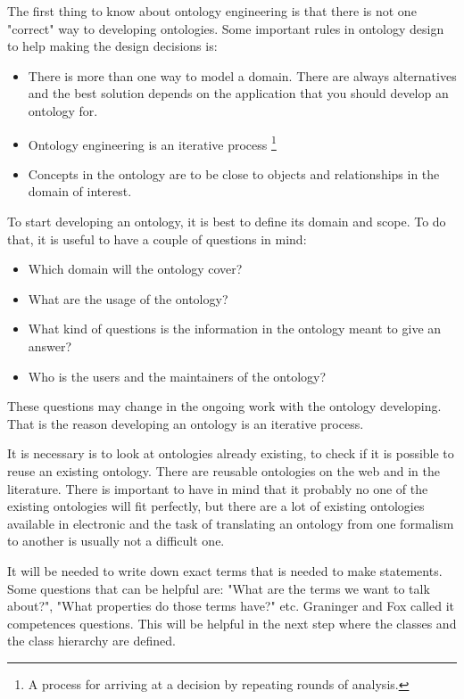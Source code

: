 The first thing to know about ontology engineering is that there is not one "correct" way to developing ontologies. Some important rules in ontology design to help making the design decisions is:
\begin{itemize}
	\item There is more than one way to model a domain. There are always alternatives and the best solution depends on the application that you should develop an ontology for.
	\item Ontology engineering is an iterative process \footnote{A process for arriving at a decision by repeating rounds of analysis.}
	\item Concepts in the ontology are to be close to objects and relationships in the domain of interest.
\end{itemize}

To start developing an ontology, it is best to define its domain and scope. To do that, it is useful to have a couple of questions in mind:
\begin{itemize}
	\item Which domain will the ontology cover?
	\item What are the usage of the ontology?
	\item What kind of questions is the information in the ontology meant to give an answer?
	\item Who is the users and the maintainers of the ontology?
\end{itemize}
These questions may change in the ongoing work with the ontology developing. That is the reason developing an ontology is an iterative process.

It is necessary is to look at ontologies already existing, to check if it is possible to reuse an existing ontology. There are reusable ontologies on the web and in the literature. There is important to have in mind that it probably no one of the existing ontologies will fit perfectly, but there are a lot of existing ontologies available in electronic and the task of translating an ontology from one formalism to another is usually not a difficult one.

It will be needed to write down exact terms that is needed to make statements. Some questions that can be helpful are: "What are the terms we want to talk about?", "What properties do those terms have?" etc. Graninger and Fox called it competences questions. This will be helpful in the next step where the classes and the class hierarchy are defined.

